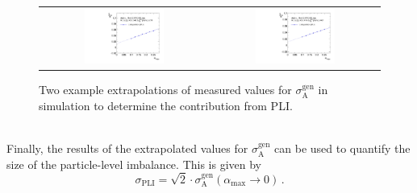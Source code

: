 \begin{figure}[!tp]
  \centering
  \begin{tabular}{cc}
                \includegraphics[width=0.49\textwidth]{figures/Extrapol_Eta0_pt4_gen_final_nominal_v4b.pdf} &
                \includegraphics[width=0.49\textwidth]{figures/Extrapol_Eta0_pt9_gen_final_nominal_v4b.pdf}
  \end{tabular}
  \caption{Two example extrapolations of measured values for $\sigma^\mathrm{gen}_\mathrm{A}$ in simulation to determine the contribution from PLI.}
  \label{fig:extrapol_gen}
\end{figure}
\\
Finally, the results of the extrapolated values for $\sigma^\mathrm{gen}_\mathrm{A}$ can be used to quantify the size of the particle-level imbalance. This is given by
 \begin{equation}
 \label{eq:pli}
 \sigma_\mathrm{PLI} = \sqrt{2} \cdot \sigma^\mathrm{gen}_\mathrm{A}(\alpha_\mathrm{max} \rightarrow 0) \, .
 \end{equation}

